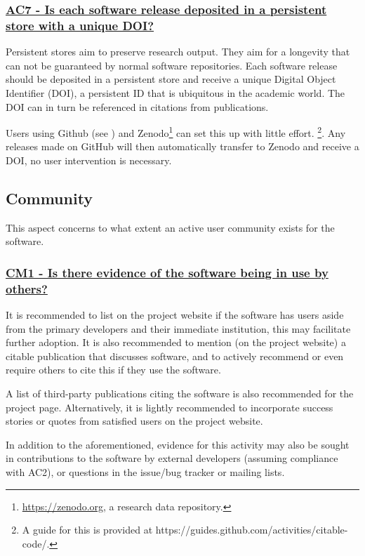 \documentclass[a4paper,11pt]{article}
\newcommand{\criterion}[2]{\subsubsection*{\underline{#1 - #2}}\label{id:#1}}
\newcommand\CheckTable{%
  \begin{tabular}{ccccc}
    No & Minimal & Adequate & Good & Perfect \\
    0 & 1 & 2 & 3 & 4 \\
    \hline
    $\square$ & $\square$ & $\square$ & $\square$ & $\square$ \\
  \end{tabular}%
}
\newcommand{\refcrit}[1]{%
 \framebox[1.1\width]{\hyperref[id:#1]{#1}}
}
\begin{document}

\newcommand{\acSevenID}{AC7}
\newcommand{\acSevenText}{Is each software release deposited in a persistent store with a unique DOI?}
\criterion{\acSevenID}{\acSevenText}

Persistent stores aim to preserve research output. They aim for a longevity
that can not be guaranteed by normal software repositories. Each software
release should be deposited in a persistent store and receive a unique Digital
Object Identifier (DOI),  a persistent ID that is ubiquitous in the academic
world. The DOI can in turn be referenced in citations from publications.

Users using Github (see \refcrit{AC2}) and Zenodo\footnote{\url{https://zenodo.org}, a
research data repository.} can set this up with little effort. \footnote{A guide
for this is provided at https://guides.github.com/activities/citable-code/.}.
Any releases made on GitHub will then automatically transfer to Zenodo and
receive a DOI, no user intervention is necessary. 


\subsection{Community}\label{sec:com}

This aspect concerns to what extent an active user community exists for the
software.

\newcommand{\cmOneID}{CM1}
\newcommand{\cmOneText}{Is there evidence of the software being in use by others?}
\criterion{\cmOneID}{\cmOneText}

It is recommended to list on the project website if the software has 
users aside from the primary developers and their immediate institution, this
may facilitate further adoption. It is also recommended to mention (on the
project website) a citable publication that discusses software, and to actively
recommend or even require others to cite this if they use the software.

A list of third-party publications citing the software is also recommended for
the project page. Alternatively, it is lightly recommended to
incorporate success stories or quotes from satisfied users on the project
website.

In addition to the aforementioned, evidence for this activity may also be sought
in contributions to the software by external developers (assuming
compliance with AC2), or questions in the issue/bug tracker or mailing lists.
\end{document}
